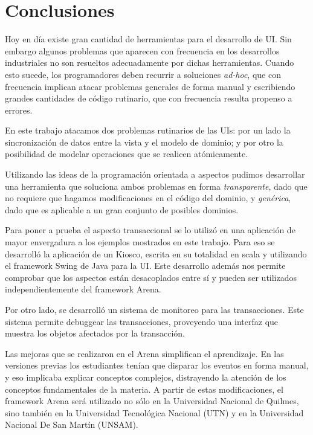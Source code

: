\section{Conclusiones}
\label{conclusions}
Hoy en día existe gran cantidad de herramientas para el
desarrollo de UI. Sin embargo algunos problemas que
aparecen con frecuencia en los desarrollos industriales no son resueltos
adecuadamente por dichas herramientas.
 Cuando esto sucede, los programadores deben recurrir a soluciones
\emph{ad-hoc},  que con frecuencia implican atacar problemas generales de forma
manual y escribiendo grandes cantidades de código rutinario, que con
frecuencia resulta propenso a errores.

En este trabajo atacamos dos problemas rutinarios de las UIs:
por un lado la sincronización de datos entre la vista y el modelo de dominio; y
por otro la posibilidad de modelar operaciones que se realicen atómicamente.

Utilizando las ideas de la programación orientada a aspectos pudimos desarrollar
una herramienta que soluciona ambos problemas en forma \emph{transparente}, dado
que no requiere que hagamos modificaciones en el código del dominio, y \emph{genérica},
dado que es aplicable a un gran conjunto de posibles dominios.

\medskip

Para poner a prueba el aspecto transaccional se lo utilizó en una aplicación de
mayor envergadura a los ejemplos mostrados en este trabajo.
Para eso se desarrolló la aplicación de un Kiosco, escrita en su totalidad en
scala y utilizando el framework Swing de Java para la UI.
Este desarrollo además nos permite comprobar que los aspectos están desacoplados
entre sí y pueden ser utilizados independientemente del framework Arena.


Por otro lado, se desarrolló un sistema de monitoreo para las transacciones.
Este sistema permite debuggear las transacciones, proveyendo una interfaz que muestra los
objetos afectados por la transacción.


Las mejoras que se realizaron en el Arena simplifican el aprendizaje.
En las versiones previas los estudiantes tenían que disparar los eventos en forma
manual, y eso implicaba explicar conceptos complejos, distrayendo la atención de
los conceptos fundamentales de la materia.
A partir de estas modificaciones, el framework Arena será utilizado no
sólo en la Universidad Nacional de Quilmes, sino también en la Universidad
Tecnológica Nacional (UTN) y en la Universidad Nacional De San Martín (UNSAM).
